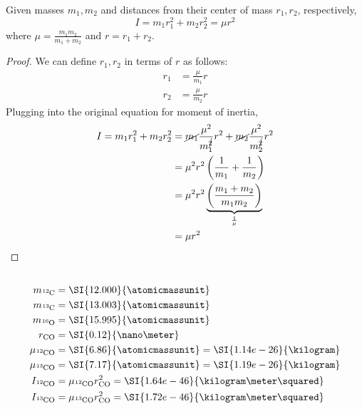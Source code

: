 \documentclass{article}
\begin{document}
\begin{theorem}
    Given masses \(m_1, m_2\) and distances from their center of mass \(r_1, r_2\), respectively,
    \begin{equation}
        I = m_1 r_1^2 + m_2 r_2^2 = \mu r^2
    \end{equation}
    where \(\mu = \frac{m_1 m_2}{m_1 + m_2}\) and \(r = r_1 + r_2\).
\end{theorem}
\begin{proof}
    We can define \(r_1, r_2\) in terms of \(r\) as follows:
    \begin{align}
        r_1 &= \frac{\mu}{m_1} r \\
        r_2 &= \frac{\mu}{m_2} r
    \end{align}
    Plugging into the original equation for moment of inertia,
    \begin{align}
        I = m_1 r_1^2 + m_2 r_2^2 &= \cancel{m_1} \frac{\mu^2}{m_1^{\cancel{2}}} r^2 + \cancel{m_2} \frac{\mu^2}{m_2^{\cancel{2}}} r^2 \\
        &= \mu^2 r^2 \left(\frac{1}{m_1} + \frac{1}{m_2}\right) \\
        &= \mu^2 r^2 \underbrace{\left(\frac{m_1 + m_2}{m_1 m_2}\right)}_{\frac{1}{\mu}} \\
        &= \mu r^2
    \end{align}
\end{proof}

\subsection{}

\begin{align}
    m_{\ce{^{12}C}} &= \SI{12.000}{\atomicmassunit} \\
    m_{\ce{^{13}C}} &= \SI{13.003}{\atomicmassunit} \\
    m_{\ce{^{16}O}} &= \SI{15.995}{\atomicmassunit} \\
    r_{\ce{CO}} &= \SI{0.12}{\nano\meter} \\
    \mu_{\ce{^{12}CO}} &= \SI{6.86}{\atomicmassunit} = \SI{1.14e-26}{\kilogram} \\
    \mu_{\ce{^{13}CO}} &= \SI{7.17}{\atomicmassunit} = \SI{1.19e-26}{\kilogram} \\
    I_{\ce{^{12}CO}} &= \mu_{\ce{^{12}CO}} r_{\ce{CO}}^2 = \SI{1.64e-46}{\kilogram\meter\squared} \\
    I_{\ce{^{13}CO}} &= \mu_{\ce{^{13}CO}} r_{\ce{CO}}^2 = \SI{1.72e-46}{\kilogram\meter\squared}
\end{align}
\end{document}
